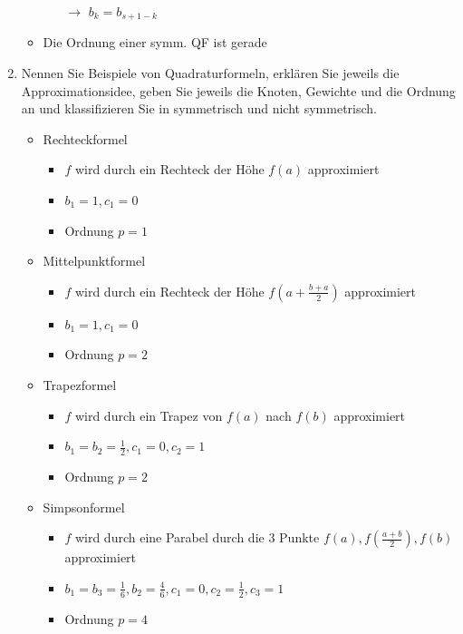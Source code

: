 \documentclass[]{article}
\begin{document}
\begin{enumerate}
\begin{itemize}
\begin{itemize}
						\item[$\rightarrow$] $b_k = b_{s+1-k}$
					\end{itemize}
				\item Die Ordnung einer symm. QF ist gerade	
			\end{itemize}
		\item Nennen Sie Beispiele von Quadraturformeln, erklären Sie jeweils die Approximationsidee, geben Sie jeweils die Knoten, Gewichte und die Ordnung an und klassifizieren Sie in symmetrisch und nicht symmetrisch.
			\begin{itemize}
				\item Rechteckformel
					\begin{itemize}
						\item $f$ wird durch ein Rechteck der Höhe $f(a)$ approximiert
						\item $b_1 = 1, c_1 = 0$
						\item Ordnung $p = 1$
					\end{itemize}
				\item Mittelpunktformel
					\begin{itemize}
						\item $f$ wird durch ein Rechteck der Höhe $f(a + \frac{b+a}{2})$ approximiert
						\item $b_1 = 1, c_1 = 0$
						\item Ordnung $p = 2$
					\end{itemize}
				\item Trapezformel
					\begin{itemize}
						\item $f$ wird durch ein Trapez von $f(a)$ nach $f(b)$ approximiert
						\item $b_1 = b_2 = \frac{1}{2}, c_1 = 0, c_2 = 1$
						\item Ordnung $p = 2$
					\end{itemize}
				\item Simpsonformel
					\begin{itemize}
						\item $f$ wird durch eine Parabel durch die 3 Punkte $f(a), f(\frac{a+b}{2}), f(b)$ approximiert
						\item $b_1 = b_3 = \frac{1}{6}, b_2 = \frac{4}{6}, c_1 = 0, c_2 = \frac{1}{2}, c_3 = 1$
						\item Ordnung $p = 4$
					\end{itemize}
			\end{itemize}
	\end{enumerate}
\end{document}

